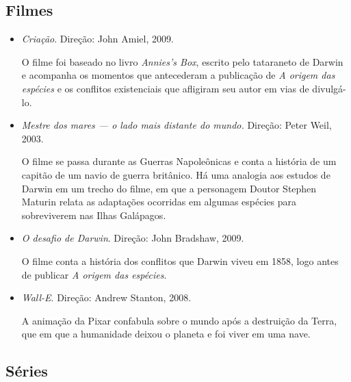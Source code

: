 \documentclass[11pt]{extarticle}
\begin{document}
\subsection{Filmes}

\begin{itemize}

\item \emph{Criação}. Direção: John Amiel, 2009.

O filme foi baseado no livro \emph{Annies’s Box}, escrito pelo tataraneto de Darwin e acompanha os momentos que antecederam a publicação de \emph{A origem das espécies} e os conflitos existenciais que afligiram seu autor em vias de divulgá-lo. 

\item \emph{Mestre dos mares --- o lado mais distante do mundo.} Direção: Peter Weil, 2003.

O filme se passa durante as Guerras Napoleônicas e conta a história de um capitão de um navio de guerra britânico. 
Há uma analogia aos estudos de Darwin em um trecho do filme, em que a personagem Doutor Stephen Maturin relata as adaptações ocorridas em algumas espécies para sobreviverem nas Ilhas Galápagos.

\item \emph{O desafio de Darwin}. Direção: John Bradshaw, 2009.

O filme conta a história dos conflitos que Darwin viveu em 1858,
logo antes de publicar \emph{A origem das espécies}. 

\item \emph{Wall-E}. Direção: Andrew Stanton, 2008.

A animação da Pixar confabula sobre o mundo após a destruição da Terra, que em que a humanidade deixou o planeta e foi viver em uma nave.

\end{itemize}

\subsection{Séries}
\end{document}
